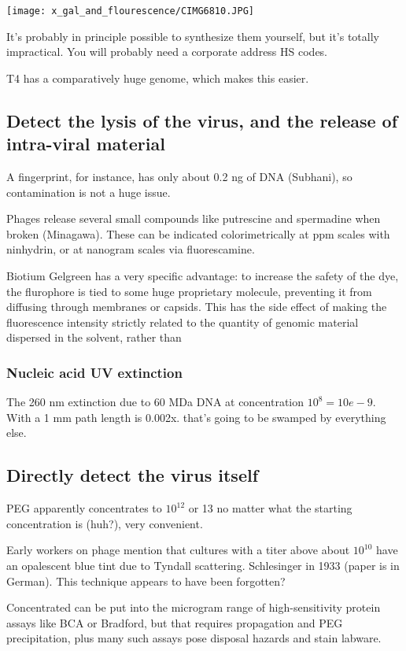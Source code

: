 \documentclass[paper.tex]{subfiles}
\begin{document}
\texttt{[image: x\_gal\_and\_flourescence/CIMG6810.JPG]}

 It’s probably in principle possible to synthesize them yourself, but it’s totally impractical. You will probably need a corporate address HS codes. 

T4 has a comparatively huge genome, which makes this easier.


\subsection{Detect the lysis of the virus, and the release of intra-viral material}

A fingerprint, for instance, has only about 0.2 ng of DNA (Subhani), so contamination is not a huge issue.

Phages release several small compounds like putrescine and spermadine when broken (Minagawa\cite{characteristics1961}). These can be indicated colorimetrically at ppm scales with ninhydrin, or at nanogram scales via fluorescamine. 


Biotium Gelgreen has a very specific advantage: to increase the safety of the dye, the flurophore is tied to some huge proprietary molecule, preventing it from diffusing through membranes or capsids. This has the side effect of making the fluorescence intensity strictly related to the quantity of genomic material dispersed in the solvent, rather than 




\subsubsection{Nucleic acid UV extinction }


The 260 nm extinction due to 60 MDa DNA at concentration $10^8 = 10e-9$. With a 1 mm path length is 0.002x. that's going to be swamped by everything else.


\subsection{Directly detect the virus itself}

PEG apparently concentrates to $10^{12}$ or 13 no matter what the starting concentration is (huh?), very convenient.

Early workers on phage mention\cite{ADSORPTION1940}  that cultures with a titer above about $10^10$ have an opalescent blue tint due to Tyndall scattering. Schlesinger in 1933 \cite{Beobachtung1933} (paper is in German). This technique appears to have been forgotten?



Concentrated can be put into the microgram range of high-sensitivity protein assays like BCA or Bradford, but that requires propagation and PEG precipitation, plus many such assays pose disposal hazards and stain labware. 
\end{document}
